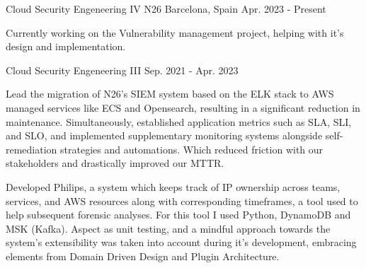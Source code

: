 
\begin{cventries}
	\cventry
	{Cloud Security Engeneering IV} %
	{N26} %
	{Barcelona, Spain} %
	{Apr. 2023 - Present} %
	{
		\begin{cvitems} %
			\item {Currently working on the Vulnerability management project, helping with it's design and implementation.}
		\end{cvitems}
	}

	\cventry
	{Cloud Security Engeneering III} %
	{} %
	{} %
	{Sep. 2021 - Apr. 2023} %
	{
		\begin{cvitems} %
			\item {Lead the migration of N26's SIEM system based on the ELK stack to AWS managed services like ECS and Opensearch, resulting in a significant reduction in maintenance. Simultaneously, established application metrics such as SLA, SLI, and SLO, and implemented supplementary monitoring systems alongside self-remediation strategies and automations. Which reduced friction with our stakeholders and drastically improved our MTTR.}
			\item {Developed Philips, a system which keeps track of IP ownership across teams, services, and AWS resources along with corresponding timeframes, a tool used to help subsequent forensic analyses. For this tool I used Python, DynamoDB and MSK (Kafka). Aspect as unit testing, and a mindful approach towards the system's extensibility was taken into account during it's development, embracing elements from Domain Driven Design and Plugin Architecture.}
		\end{cvitems}
	}


\end{cventries}
